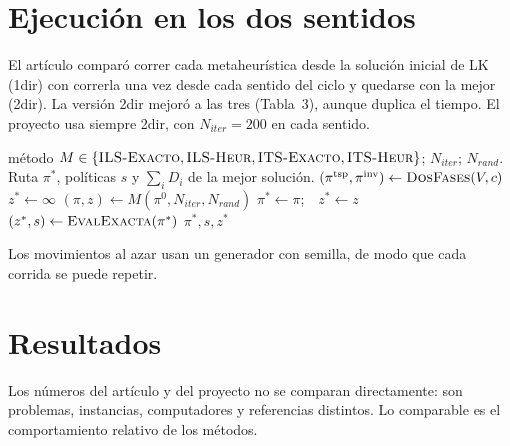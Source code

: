 \documentclass{article}
\newcommand{\EvalE}{\mbox{\textsc{EvalExacta}}}
\newcommand{\Niter}{N_{\mathit{iter}}}
\newcommand{\Nrand}{N_{\mathit{rand}}}
\begin{document}
\section{Ejecución en los dos sentidos}

El artículo comparó correr cada metaheurística desde la solución inicial de LK (1dir) con correrla una vez desde cada sentido del ciclo y quedarse con la mejor (2dir). La versión 2dir mejoró a las tres (Tabla~3), aunque duplica el tiempo. El proyecto usa siempre 2dir, con $\Niter = 200$ en cada sentido.

\begin{algorithm}[H]
\caption{$\textsc{Resolver}(M, \Niter, \Nrand)$ \quad (versión 2dir)}
\label{alg:resolver}
\begin{algorithmic}[1]
\Require método $M \in \{\textsc{ILS-Exacto}, \textsc{ILS-Heur}, \textsc{ITS-Exacto}, \textsc{ITS-Heur}\}$; $\Niter$; $\Nrand$.
\Ensure Ruta $\pi^*$, políticas $s$ y $\sum_i D_i$ de la mejor solución.
\State $(\pi^{\mathrm{tsp}}, \pi^{\mathrm{inv}}) \gets \textsc{DosFases}(V, c)$
\State $z^* \gets \infty$
 
    \State $(\pi, z) \gets M(\pi^0, \Niter, \Nrand)$
        \State $\pi^* \gets \pi$;\ \ $z^* \gets z$
    \EndIf
\EndFor
\State $(z^*, s) \gets \EvalE(\pi^*)$ 
\State \Return $\pi^*, s, z^*$
\end{algorithmic}
\end{algorithm}

\noindent Los movimientos al azar usan un generador con semilla, de modo que cada corrida se puede repetir.

\section{Resultados}\label{sec:resultados}

Los números del artículo y del proyecto no se comparan directamente: son problemas, instancias, computadores y referencias distintos. Lo comparable es el comportamiento relativo de los métodos.
\end{document}
